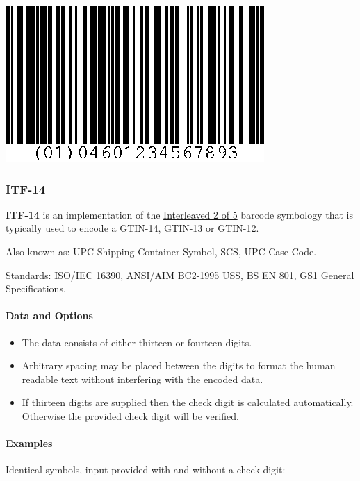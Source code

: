 \includegraphics{images/ean14-1.eps}

\hypertarget{itf-14}{%
\subsubsection{ITF-14}\label{itf-14}}

\textbf{ITF-14} is an implementation of the
\protect\hyperlink{interleaved-2-of-5}{Interleaved 2 of 5} barcode
symbology that is typically used to encode a GTIN-14, GTIN-13 or
GTIN-12.

Also known as: UPC Shipping Container Symbol, SCS, UPC Case Code.

Standards: ISO/IEC 16390, ANSI/AIM BC2-1995 USS, BS EN 801, GS1 General
Specifications.

\hypertarget{data-and-options-26}{%
\paragraph{Data and Options}\label{data-and-options-26}}

\begin{itemize}
\tightlist
\item
  The data consists of either thirteen or fourteen digits.
\item
  Arbitrary spacing may be placed between the digits to format the human
  readable text without interfering with the encoded data.
\item
  If thirteen digits are supplied then the check digit is calculated
  automatically. Otherwise the provided check digit will be verified.
\end{itemize}

\hypertarget{examples-21}{%
\paragraph{Examples}\label{examples-21}}

Identical symbols, input provided with and without a check digit:

